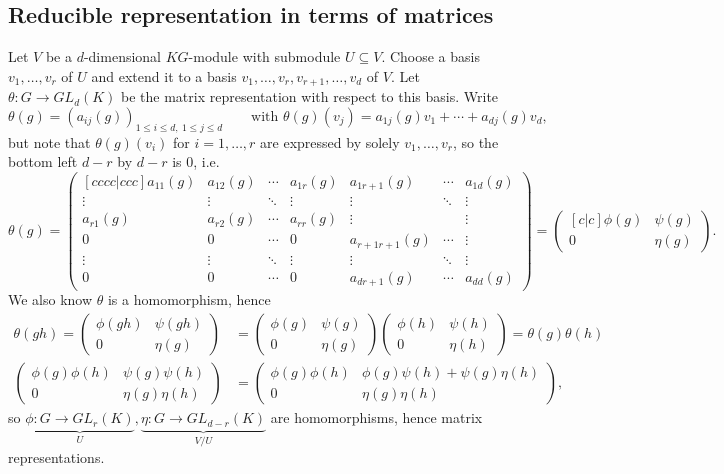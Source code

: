 \documentclass{article}
\theoremstyle{definition}
\begin{document}
\subsection{Reducible representation in terms of matrices}
\label{subsection:reducrepandblockdiagmat}
Let $V$ be a $d$-dimensional $KG$-module with submodule $U\subseteq V$. Choose a basis $v_1,\ldots,v_r$ of $U$ and extend it to a basis $v_1,\ldots,v_r,v_{r+1},\ldots,v_d$ of $V$. Let $\theta:G\rightarrow GL_d(K)$ be the matrix representation with respect to this basis. Write
\[
\theta(g)=(a_{ij}(g))_{1\leq i\leq d,\ 1\leq j\leq d} \qquad \text{with } \theta(g)(v_j)=a_{1j}(g)v_1+\cdots+a_{dj}(g)v_d, 
\]
but note that $\theta(g)(v_i)$ for $i=1,\ldots,r$ are expressed by solely $v_1,\ldots,v_r$, so the bottom left $d-r$ by $d-r$ is 0, i.e.
\[
\theta(g)=\begin{pmatrix}[cccc|ccc]
a_{11}(g) & a_{12}(g) & \cdots & a_{1r}(g) & a_{1r+1}(g) & \cdots & a_{1d}(g)\\
\vdots & \vdots & \ddots & \vdots & \vdots & \ddots & \vdots \\
a_{r1}(g) & a_{r2}(g) & \cdots & a_{rr}(g) & \vdots & & \vdots \\ \hline
0 & 0 & \cdots & 0 & a_{r+1r+1}(g) & \cdots & \vdots \\
\vdots & \vdots & \ddots & \vdots & \vdots & \ddots & \vdots \\
0 & 0 & \cdots & 0 & a_{dr+1}(g) & \cdots & a_{dd}(g)
\end{pmatrix}=\begin{pmatrix}[c|c]
\phi(g)&\psi(g)\\ \hline
0 & \eta(g)
\end{pmatrix}.
\]
We also know $\theta$ is a homomorphism, hence
\[
\begin{aligned}
\theta(gh)=\begin{pmatrix}\phi(gh)&\psi(gh)\\0 & \eta(g)\end{pmatrix}&=\begin{pmatrix}\phi(g)&\psi(g)\\0 & \eta(g)\end{pmatrix}\begin{pmatrix}\phi(h)&\psi(h)\\0 & \eta(h)\end{pmatrix}=\theta(g)\theta(h)\\
\begin{pmatrix}\phi(g)\phi(h)&\psi(g)\psi(h)\\0&\eta(g)\eta(h)\end{pmatrix}&=\begin{pmatrix}\phi(g)\phi(h)&\phi(g)\psi(h)+\psi(g)\eta(h)\\0&\eta(g)\eta(h)\end{pmatrix},
\end{aligned}
\]
so $\underbrace{\phi:G\rightarrow GL_r(K)}_{U},\underbrace{\eta:G\rightarrow GL_{d-r}(K)}_{V/U}$ are homomorphisms, hence matrix representations.
\end{document}
